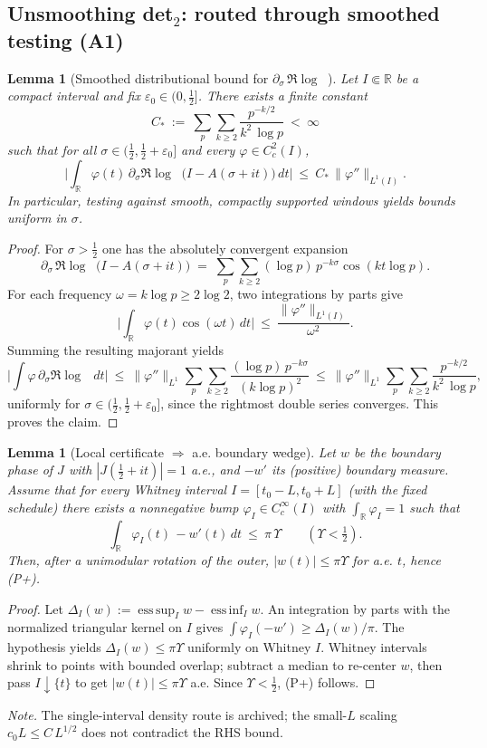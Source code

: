 \documentclass[11pt]{article}
\newtheorem{lemma}[theorem]{Lemma}
\theoremstyle{definition}
\theoremstyle{remark}
\newcommand{\R}{\mathbb{R}}
\DeclareMathOperator{\dettwo}{det_2}
\begin{document}
\subsection*{Unsmoothing det$_2$: routed through smoothed testing (A1)}
\begin{lemma}[Smoothed distributional bound for $\partial_\sigma\,\Re\log\dettwo$]\label{lem:det2-unsmoothed}
Let $I\Subset\R$ be a compact interval and fix $\varepsilon_0\in(0,\tfrac12]$. There exists a finite constant
\[
  C_*\ :=\ \sum_{p}\sum_{k\ge 2}\frac{p^{-k/2}}{k^2\,\log p}\ <\ \infty
\]
such that for all $\sigma\in(\tfrac12,\tfrac12+\varepsilon_0]$ and every $\varphi\in C_c^2(I)$,
\[
  \Big|\int_{\R} \varphi(t)\,\partial_\sigma\Re\log\dettwo\big(I-A(\sigma+it)\big)\,dt\Big|\ \le\ C_*\,\|\varphi''\|_{L^1(I)}.
\]
In particular, testing against smooth, compactly supported windows yields bounds uniform in $\sigma$.
\end{lemma}
\begin{proof}
For $\sigma>\tfrac12$ one has the absolutely convergent expansion
\[
  \partial_\sigma\,\Re\log\dettwo\big(I-A(\sigma+it)\big)
  \;=\; \sum_{p}\sum_{k\ge 2} (\log p)\,p^{-k\sigma}\cos(k t\log p).
\]
For each frequency $\omega=k\log p\ge 2\log 2$, two integrations by parts give
\[
  \Big|\int_{\R}\!\varphi(t)\cos(\omega t)\,dt\Big|\ \le\ \frac{\|\varphi''\|_{L^1(I)}}{\omega^2}.
\]
Summing the resulting majorant yields
\[
  \Big|\int \varphi\,\partial_\sigma\Re\log\dettwo\,dt\Big|
  \ \le\ \|\varphi''\|_{L^1}\sum_{p}\sum_{k\ge 2}\frac{(\log p)\,p^{-k\sigma}}{(k\log p)^2}
  \ \le\ \|\varphi''\|_{L^1}\sum_{p}\sum_{k\ge 2}\frac{p^{-k/2}}{k^2\,\log p},
\]
uniformly for $\sigma\in(\tfrac12,\tfrac12+\varepsilon_0]$, since the rightmost double series converges. This proves the claim.
\end{proof}
\begin{lemma}[Local certificate $\Rightarrow$ a.e. boundary wedge]\label{lem:local-to-global-wedge}
Let $w$ be the boundary phase of $J$ with $|J(\tfrac12+it)|=1$ a.e., and $-w'$ its (positive) boundary measure. Assume that for every Whitney interval $I=[t_0-L,t_0+L]$ (with the fixed schedule) there exists a nonnegative bump $\varphi_I\in C_c^\infty(I)$ with $\int_\R\!\varphi_I=1$ such that
\[
  \int_\R \varphi_I(t)\,-w'(t)\,dt\ \le\ \pi\,\Upsilon\qquad(\Upsilon<\tfrac12).
\]
Then, after a unimodular rotation of the outer, $|w(t)|\le \pi\Upsilon$ for a.e. $t$, hence \textup{(P+)}.
\end{lemma}
\begin{proof}
Let $\Delta_I(w):=\operatorname*{ess\,sup}_I w-\operatorname*{ess\,inf}_I w$. An integration by parts with the normalized triangular kernel on $I$ gives $\int \varphi_I(-w')\ge \Delta_I(w)/\pi$. The hypothesis yields $\Delta_I(w)\le \pi\Upsilon$ uniformly on Whitney $I$. Whitney intervals shrink to points with bounded overlap; subtract a median to re-center $w$, then pass $I\downarrow\{t\}$ to get $|w(t)|\le\pi\Upsilon$ a.e. Since $\Upsilon<\tfrac12$, \textup{(P+)} follows.
\end{proof}
\noindent\emph{Note.} The single-interval density route is archived; the small-$L$ scaling $c_0 L \le C\,L^{1/2}$ does not contradict the RHS bound.
\end{document}
